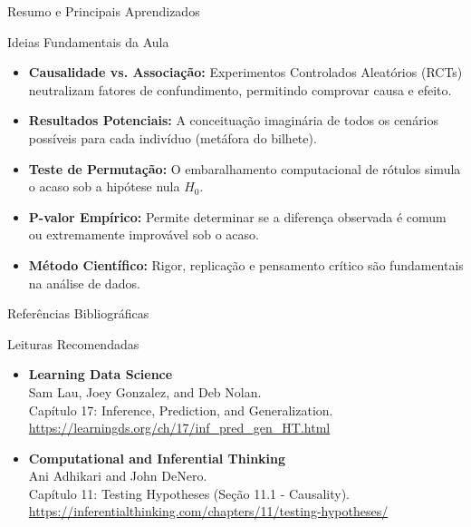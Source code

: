 \begin{frame}{Resumo e Principais Aprendizados}
    \begin{block}{Ideias Fundamentais da Aula}
        \begin{itemize}
            \item \textbf{Causalidade vs. Associação:} Experimentos Controlados Aleatórios (RCTs) neutralizam fatores de confundimento, permitindo comprovar causa e efeito.
            \item \textbf{Resultados Potenciais:} A conceituação imaginária de todos os cenários possíveis para cada indivíduo (metáfora do bilhete).
            \item \textbf{Teste de Permutação:} O embaralhamento computacional de rótulos simula o acaso sob a hipótese nula $H_0$.
            \item \textbf{P-valor Empírico:} Permite determinar se a diferença observada é comum ou extremamente improvável sob o acaso.
            \item \textbf{Método Científico:} Rigor, replicação e pensamento crítico são fundamentais na análise de dados.
        \end{itemize}
    \end{block}
\end{frame}

\begin{frame}{Referências Bibliográficas}
    \begin{block}{Leituras Recomendadas}
        \footnotesize
        \begin{itemize}
            \item \textbf{Learning Data Science} \\
            Sam Lau, Joey Gonzalez, and Deb Nolan. \\
            Capítulo 17: Inference, Prediction, and Generalization. \\
            \url{https://learningds.org/ch/17/inf_pred_gen_HT.html}
            \vspace{0.3cm}
            \item \textbf{Computational and Inferential Thinking} \\
            Ani Adhikari and John DeNero. \\
            Capítulo 11: Testing Hypotheses (Seção 11.1 - Causality). \\
            \url{https://inferentialthinking.com/chapters/11/testing-hypotheses/}
        \end{itemize}
    \end{block}
\end{frame}
